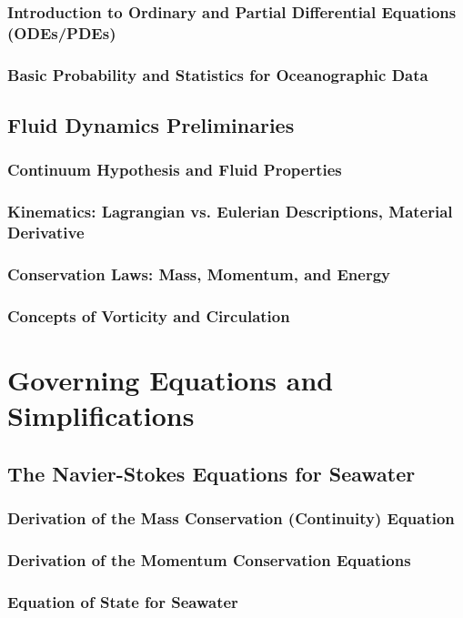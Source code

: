 \documentclass[12pt]{book}
\begin{document}
\section{Introduction to Ordinary and Partial Differential Equations (ODEs/PDEs)}
\section{Basic Probability and Statistics for Oceanographic Data}

\chapter{Fluid Dynamics Preliminaries}
\section{Continuum Hypothesis and Fluid Properties}
\section{Kinematics: Lagrangian vs. Eulerian Descriptions, Material Derivative}
\section{Conservation Laws: Mass, Momentum, and Energy}
\section{Concepts of Vorticity and Circulation}

\part{Governing Equations and Simplifications}
\chapter{The Navier-Stokes Equations for Seawater}
\section{Derivation of the Mass Conservation (Continuity) Equation}
\section{Derivation of the Momentum Conservation Equations}
\section{Equation of State for Seawater}
\end{document}
